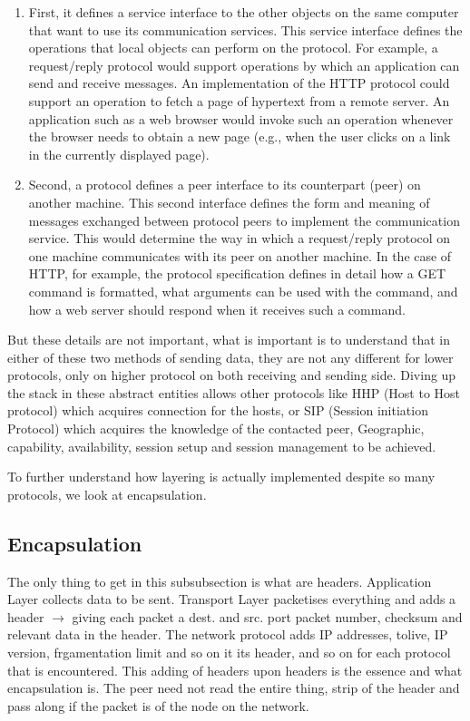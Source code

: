 \documentclass[12pt]{book}
\begin{document}
\begin{enumerate}
    \item First, it defines a service interface to the other objects on the same computer that want to use its communication services. This service interface defines the operations that local objects can perform on the protocol. For example, a request/reply protocol would support operations by which an application can send and receive messages. An implementation of the HTTP protocol could support an operation to fetch a page of hypertext from a remote server. An application such as a web browser would invoke such an operation whenever the browser needs to obtain a new page (e.g., when the user clicks on a link in the currently displayed page).
    \item Second, a protocol defines a peer interface to its counterpart (peer) on another machine. This second interface defines the form and meaning of messages exchanged between protocol peers to implement the communication service. This would determine the way in which a request/reply protocol on one machine communicates with its peer on another machine. In the case of HTTP, for example, the protocol specification defines in detail how a GET command is formatted, what arguments can be used with the command, and how a web server should respond when it receives such a command.
\end{enumerate}

But these details are not important, what is important is to understand that in either of these two methods of sending data, they are not any different for lower protocols, only on higher protocol on both receiving and sending side. Diving up the stack in these abstract entities allows other protocols like HHP (Host to Host protocol) which acquires connection for the hosts, or SIP (Session initiation Protocol) which acquires the knowledge of the contacted peer, Geographic, capability, availability, session setup and session management to be achieved.

To further understand how layering is actually implemented despite so many protocols, we look at encapsulation.

\subsection{Encapsulation}
The only thing to get in this subsubsection is what are headers. Application Layer collects data to be sent. Transport Layer packetises everything and adds a header $\to$ giving each packet a dest. and src. port packet number, checksum and relevant data in the header. The network protocol adds IP addresses, tolive, IP version, frgamentation limit and so on it its header, and so on for each protocol that is encountered. This adding of headers upon headers is the essence and what encapsulation is. The peer need not read the entire thing, strip of the header and pass along if the packet is of the node on the network.
\end{document}

